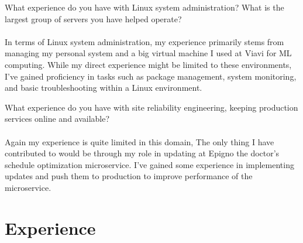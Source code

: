 \documentclass{exam}
\begin{document}
\begin{questions}
\question What experience do you have with Linux system administration? What is the largest group of servers you have helped operate?
\\~\\
In terms of Linux system administration, my experience primarily stems from managing
my personal system and a big virtual machine I used at Viavi for ML computing. 
While my direct experience might be limited to these environments, I've gained proficiency in tasks such as package management, system monitoring, and basic troubleshooting within a Linux environment.

\question What experience do you have with site reliability engineering, keeping production services online and available?
\\~\\
Again my experience is quite limited in this domain,
The only thing I have contributed to would be  through my role in updating at Epigno the doctor’s schedule optimization microservice. 
I've gained  some experience in implementing updates and push them to production to improve performance of the microservice.
\end{questions}

\section*{Experience}
\end{document}
